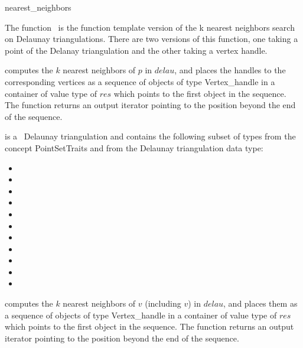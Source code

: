 
\begin{ccRefFunction}{nearest_neighbors}

\ccDefinition

The function \ccRefName\ is the function template version of the k nearest 
neighbors search on Delaunay triangulations.  There are two versions of
this function, one taking a point of the Delanay triangulation and the
other taking a vertex handle.


{computes the $k$ nearest neighbors of $p$ in $delau$, and places the
handles to the corresponding vertices as a sequence of objects of type
Vertex\_handle in a container of value type of $res$
which points to the first object in the sequence. The function
returns an output iterator pointing to the position beyond the end
of the sequence. }

 is a \cgal\ Delaunay triangulation and contains the following subset of types from the concept PointSetTraits and from
the Delaunay triangulation data type:
\begin{itemize}
  \item {}             
  \item {}                
  \item {}               
  \item {}            
  \item {}                      
  \item {}   
  \item {}                           
  \item {}                              
  \item {}                       
  \item {}                           
  \item {}    
\end{itemize}  

{computes the $k$ nearest neighbors of $v$ (including $v$) in $delau$, and places them as a sequence of objects of type
Vertex\_handle in a container of value type of $res$
which points to the first object in the sequence. The function
returns an output iterator pointing to the position beyond the end
of the sequence. }


\end{ccRefFunction}
